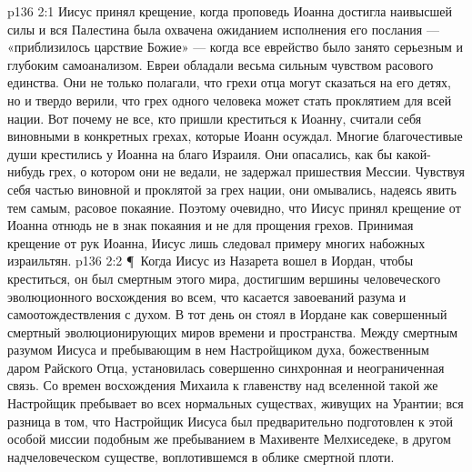 \vs p136 2:1 Иисус принял крещение, когда проповедь Иоанна достигла наивысшей силы и вся Палестина была охвачена ожиданием исполнения его послания --- «приблизилось царствие Божие» --- когда все еврейство было занято серьезным и глубоким самоанализом. Евреи обладали весьма сильным чувством расового единства. Они не только полагали, что грехи отца могут сказаться на его детях, но и твердо верили, что грех одного человека может стать проклятием для всей нации. Вот почему не все, кто пришли креститься к Иоанну, считали себя виновными в конкретных грехах, которые Иоанн осуждал. Многие благочестивые души крестились у Иоанна на благо Израиля. Они опасались, как бы какой\hyp{}нибудь грех, о котором они не ведали, не задержал пришествия Мессии. Чувствуя себя частью виновной и проклятой за грех нации, они омывались, надеясь явить тем самым, расовое покаяние. Поэтому очевидно, что Иисус принял крещение от Иоанна отнюдь не в знак покаяния и не для прощения грехов. Принимая крещение от рук Иоанна, Иисус лишь следовал примеру многих набожных израильтян.
\vs p136 2:2 \P\ Когда Иисус из Назарета вошел в Иордан, чтобы креститься, он был смертным этого мира, достигшим вершины человеческого эволюционного восхождения во всем, что касается завоеваний разума и самоотождествления с духом. В тот день он стоял в Иордане как совершенный смертный эволюционирующих миров времени и пространства. Между смертным разумом Иисуса и пребывающим в нем Настройщиком духа, божественным даром Райского Отца, установилась совершенно синхронная и неограниченная связь. Со времен восхождения Михаила к главенству над вселенной такой же Настройщик пребывает во всех нормальных существах, живущих на Урантии; вся разница в том, что Настройщик Иисуса был предварительно подготовлен к этой особой миссии подобным же пребыванием в Махивенте Мелхиседеке, в другом надчеловеческом существе, воплотившемся в облике смертной плоти.
